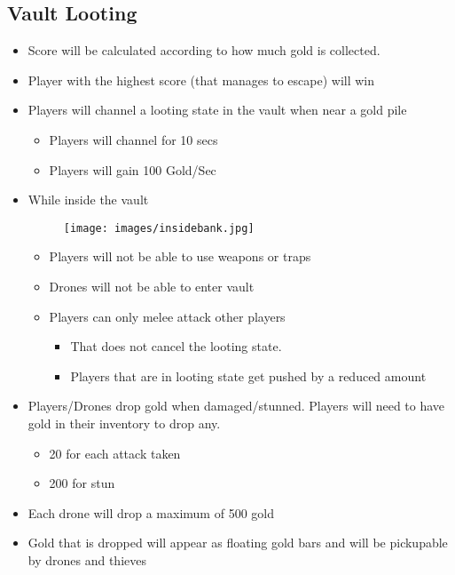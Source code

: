 \documentclass[10pt]{report}
\begin{document}
\subsection{Vault Looting}

\begin{itemize}
    \item Score will be calculated according to how much gold is collected.
    \item Player with the highest score (that manages to escape) will win
    \item Players will channel a looting state in the vault when near a gold pile 
    \begin{itemize}
        \item Players will channel for 10 secs
        \item Players will gain 100 Gold/Sec
    \end{itemize}
    \item While inside the vault
    \begin{figure}[H]
        \centering
        \texttt{[image: images/insidebank.jpg]}
        \caption{}
    \end{figure}
    \begin{itemize}
        \item Players will not be able to use weapons or traps
        \item Drones will not be able to enter vault
        \item Players can only melee attack other players 
        \begin{itemize}
            \item That does not cancel the looting state.
            \item Players that are in looting state get pushed by a reduced amount
        \end{itemize}
    \end{itemize}
    \item Players/Drones drop gold when damaged/stunned. Players will need to have gold in their inventory to drop any.
    \begin{itemize}
        \item 20  for each attack taken
        \item 200 for stun
    \end{itemize}
    \item Each drone will drop a maximum of 500 gold
    \item Gold that is dropped will appear as floating gold bars and will be pickupable by drones and thieves     
\end{itemize}
\end{document}
